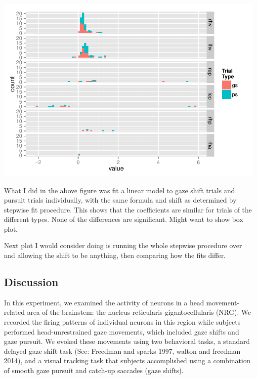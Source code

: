 \documentclass[]{article}
\begin{document}
\includegraphics{NRGRecord_files/figure-latex/gspdiff-1.pdf}

What I did in the above figure was fit a linear model to gaze shift
trials and pursuit trials individually, with the same formula and shift
as determined by stepwise fit procedure. This shows that the
coefficients are similar for trials of the different types. None of the
differences are significant. Might want to show box plot.

Next plot I would consider doing is running the whole stepwise procedure
over and allowing the shift to be anything, then comparing how the fits
differ.

\subsection{Discussion}\label{discussion}

In this experiment, we examined the activity of neurons in a head
movement-related area of the brainstem: the nucleus reticularis
gigantocellularis (NRG). We recorded the firing patterns of individual
neurons in this region while subjects performed head-unrestrained gaze
movements, which included gaze shifts and gaze pursuit. We evoked these
movements using two behavioral tasks, a standard delayed gaze shift task
(See: Freedman and sparks 1997, walton and freedman 2014), and a visual
tracking task that subjects accomplished using a combination of smooth
gaze pursuit and catch-up saccades (gaze shifts).
\end{document}
